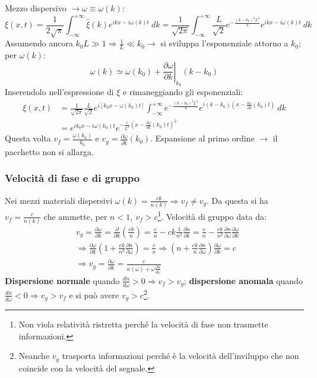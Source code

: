 \documentclass[10pt, a4paper]{scrartcl}
\newcommand*\Eval[3]{\left.#1\right\rvert_{#2}^{#3}}
\numberwithin{equation}{subsection}
\theoremstyle{style1}
\begin{document}
Mezzo dispersivo $\to \omega \equiv \omega(k)$:
\[
\xi (x,t) = \frac{1}{2\sqrt{\pi} } \int_{-\infty} ^{+\infty} \hat{\xi }(k) e^{ikx - i\omega(k) t} \ dk=\frac{1}{\sqrt{2\pi} }\int_{-\infty} ^{+\infty} \frac{L}{\sqrt{2} } e^{- \frac{(k-k_0)^2 L^2}{4}} e^{ikx - i\omega(k) t} \ dk
\] 
Assumendo ancora $k_0L\gg 1\Rightarrow \frac{1}{L}\ll k_0\to$ si sviluppa l'esponenziale attorno a $k_0$; per $\omega(k)$:
\[
	\omega(k)\simeq \omega(k_0) + \Eval{\frac{\partial \omega}{\partial k}}{k_0}{}(k-k_0) 
\] 
Inserendolo nell'espressione di $\xi $ e rimaneggiando gli esponenziali:
\begin{equation}
	\begin{split}
		\xi (x,t) &= \frac{1}{\sqrt{2\pi} }\frac{L}{\sqrt{2} } e^{i \left[ k_0x - \omega(k_0) t \right] } \int_{-\infty} ^{+\infty} e^{- \frac{(k-k_0) ^2 L^2}{4}} e^{i(k-k_0) \left(x- \frac{\partial \omega}{\partial k}(k_0)t \right) } \ dk\\
		&=e^{ik_0x - i\omega(k_0) t} e^{-\frac{1}{L^2}\left(x- \frac{\partial \omega}{\partial k}(k_0) t\right) ^2} 
	\end{split}
\end{equation}
Questa volta $v_f = \frac{\omega(k_0)}{k_0}$ e $v_g = \frac{\partial \omega}{\partial k} (k_0)$. Espansione al primo ordine $\to$ il pacchetto non si allarga.
\subsubsection{Velocit\`a di fase e di gruppo}

Nei mezzi materiali dispersivi $\omega(k) = \frac{ck}{n(k)}\Rightarrow v_f \neq v_g$. Da questa si ha $v_f = \frac{c}{n(k)}$ che ammette, per $n<1, \ v_f > c$\footnote{Non viola relativit\`a ristretta perch\'e la velocit\`a di fase non trasmette informazioni.}. Velocit\`a di gruppo data da:
\begin{equation}
	\begin{split}
		&v_g = \frac{\partial \omega}{\partial k} = \frac{\partial }{\partial k} \left(\frac{ck}{n}\right) = \frac{c}{n}- ck \frac{1}{n^2}\frac{\partial n}{\partial k} = \frac{c}{n} - \frac{ck}{n^2} \frac{\partial n}{\partial \omega} \frac{\partial \omega}{\partial k}  \\
		&\Rightarrow \frac{\partial \omega}{\partial k} \left(1+ \frac{ck}{n^2} \frac{\partial n}{\partial \omega} \right) = \frac{c}{n}\Rightarrow \left(n + \frac{ck}{n}\frac{\partial n}{\partial \omega} \right) \frac{\partial \omega}{\partial k}  = c\\
		&\Rightarrow v_g = \frac{\partial \omega}{\partial k} = \frac{c}{n(\omega) + \omega \frac{\partial n}{\partial \omega} }
	\end{split}
\end{equation}
\textbf{Dispersione normale} quando $\frac{d n}{d \omega} >0 \Rightarrow v_f > v_g$; \textbf{dispersione anomala} quando $\frac{d n}{d \omega} <0\Rightarrow v_g > v_f$ e si pu\`o avere $v_g > c$\footnote{Neanche $v_g$ trasporta informazioni perch\'e \`e la velocit\`a dell'inviluppo che non coincide con la velocit\`a del segnale.}.
\end{document}
